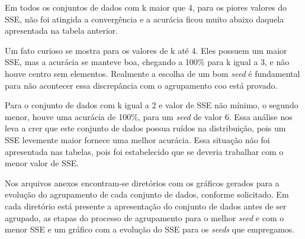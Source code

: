 \documentclass[12pt, a4paper]{article}
\begin{document}
Em todos os conjuntos de dados com k maior que 4, para os piores valores do SSE, não foi atingida a convergência e a acurácia ficou muito abaixo daquela apresentada na tabela anterior.

Um fato curioso se mostra para os valores de k até 4. Eles possuem um maior SSE, mas a acurácia se manteve boa, chegando a 100\% para k igual a 3, e não houve centro sem elementos. Realmente a escolha de um bom \emph{seed} é fundamental para não acontecer essa discrepância com o agrupamento coo está provado.

Para o conjunto de dados com k igual a 2 e valor de SSE não mínimo, o segundo menor, houve uma acurácia de 100\%, para um \emph{seed} de valor 6. Essa análise nos leva a crer que este conjunto de dados possua ruídos na distribuição, pois um SSE levemente maior fornece uma melhor acurácia. Essa situação não foi apresentada nas tabelas, pois foi estabelecido que se deveria trabalhar com o menor valor de SSE.

Nos arquivos anexos encontram-se diretórios com os gráficos gerados para a evolução do agrupamento de cada conjunto de dados, conforme solicitado. Em cada diretório está presente a apresentação do conjunto de dados antes de ser agrupado, as etapas do processo de agrupamento para o melhor \textit{seed} e com o menor SSE e um gráfico com a evolução do SSE para os \emph{seeds} que empregamos.
\end{document}
